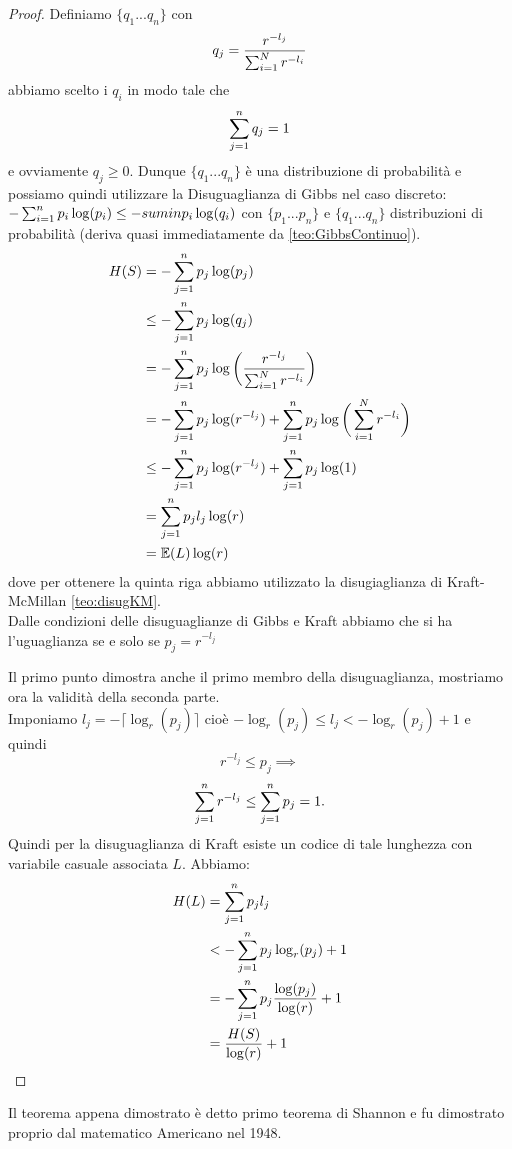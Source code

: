 \begin{proof}
\item Definiamo $\{q_1...q_n \}$ con
\begin{equation}
q_j=\frac{r^{-l_j}}{\sum_{i=1}^N r^{-l_i}}
\end{equation}
abbiamo scelto i $q_i$ in modo tale che 
$$\sum_{j=1}^n q_j=1$$
e ovviamente $q_j\geq 0$.
Dunque $\{q_1...q_n \}$ è una distribuzione di probabilità e possiamo quindi utilizzare la Disuguaglianza di Gibbs nel caso discreto: $- \sum_{i=1}^n p_i \log(p_i) \leq -sumin p_i \log(q_i)$ con $\{p_1...p_n \}$ e $\{q_1...q_n \}$ distribuzioni di probabilità (deriva quasi immediatamente da \ref{teo:GibbsContinuo}).\\
\[
\begin{split}
H(S)& = - \sum_{j=1}^n p_j \log(p_j) \\
& \leq  - \sum_{j=1}^n p_j \log(q_j)\\
& =  - \sum_{j=1}^n p_j \log \bigg(\frac{r^{-l_j}}{\sum_{i=1}^N r^{-l_i}} \bigg)\\
& =  - \sum_{j=1}^n p_j \log ( r^{-l_j}) +\sum_{j=1}^n p_j \log \bigg( \sum_{i=1}^N r^{-l_i} \bigg)\\
& \leq - \sum_{j=1}^n p_j \log ( r^{-l_j}) +\sum_{j=1}^n p_j \log (1)\\
& =\sum_{j=1}^n p_j l_j \log ( r)\\
&= \mathbb{E}(L)\log (r)
\end{split}
\]
dove per ottenere la quinta riga abbiamo utilizzato la disugiaglianza di Kraft-McMillan \ref{teo:disugKM}.\\
Dalle condizioni delle disuguaglianze di Gibbs e Kraft abbiamo che si ha l'uguaglianza se e solo se $p_j=r^{-l_j}$
\item  Il primo punto dimostra anche il primo membro della disuguaglianza, mostriamo ora la validità della seconda parte.\\
Imponiamo $l_j =  -\lceil \log_r(p_j) \rceil$ cioè  $- \log_r(p_j) \leq l_j < - \log_r(p_j) +1$ e quindi 
$$r^{-l_j} \leq p_j \implies $$ 
$$  \sum_{j=1}^n r^{-l_j} \leq \sum_{j=1}^n p_j=1.$$
Quindi per la disuguaglianza di Kraft esiste un codice di tale lunghezza con variabile casuale associata $L$. Abbiamo:
\[
\begin{split}
H(L)& =  \sum_{j=1}^n p_j l_j \\
& <   - \sum_{j=1}^n p_j  \log_r(p_j) +1\\
& = - \sum_{j=1}^n p_j  \frac{\log(p_j)}{\log(r)} +1 \\
& =  \frac{H(S)}{ \log (r)} +1
\end{split}
\]
\end{proof}
Il teorema appena dimostrato è detto primo teorema di Shannon e fu dimostrato proprio dal matematico Americano nel 1948.\\


